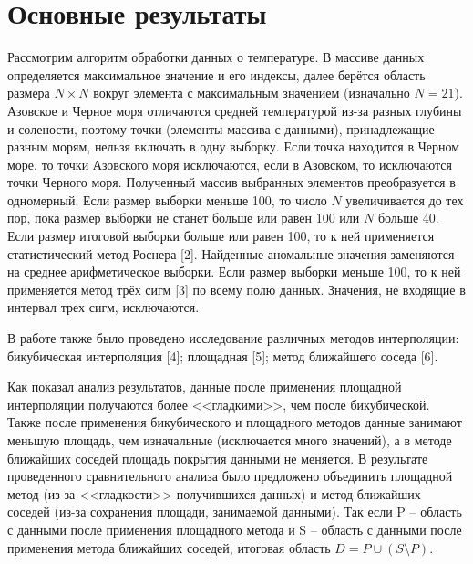 \section{Основные результаты} %

Рассмотрим алгоритм обработки данных о температуре. В массиве данных определяется максимальное значение и его индексы, далее берётся область размера $N\times N$ вокруг элемента с максимальным значением (изначально $N = 21$). Азовское и Черное моря отличаются средней температурой из-за разных глубины и солености, поэтому точки (элементы массива с данными), принадлежащие разным морям, нельзя включать в одну выборку.  Если точка находится в Черном море, то точки Азовского моря исключаются, если в Азовском, то исключаются точки Черного моря. Полученный массив выбранных элементов преобразуется в одномерный. Если размер выборки меньше 100, то число $N$ увеличивается до тех пор, пока размер выборки не станет больше или равен 100 или $N$ больше 40. 
Если размер итоговой выборки больше или равен 100, то к ней применяется статистический метод Роснера [2]. Найденные аномальные значения заменяются на среднее арифметическое выборки. Если размер выборки меньше 100, то к ней применяется метод трёх сигм [3] по всему полю данных. Значения, не входящие в интервал трех сигм, исключаются.


  


В работе также было проведено исследование различных методов интерполяции: бикубическая интерполяция [4]; площадная [5]; метод ближайшего соседа [6].

Как показал анализ результатов, данные после применения площадной интерполяции получаются более <<гладкими>>, чем после бикубической. Также после применения бикубического и площадного методов данные занимают меньшую площадь, чем изначальные (исключается много значений), а в методе ближайших соседей площадь покрытия данными не меняется.
В результате проведенного сравнительного анализа было предложено объединить площадной метод (из-за <<гладкости>> получившихся данных) и метод ближайших соседей (из-за сохранения площади, занимаемой данными). Так если P -- область с данными после применения площадного метода и S -- область с данными после применения метода ближайших соседей, итоговая область $D = P \cup (S \setminus P)$.

